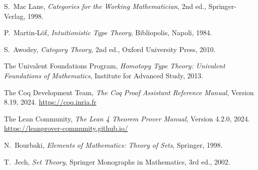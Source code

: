 \documentclass[11pt]{article}
\begin{document}
\begin{thebibliography}{99}
S.~Mac Lane, \emph{Categories for the Working Mathematician}, 2nd ed., Springer-Verlag, 1998.

P.~Martin-Löf, \emph{Intuitionistic Type Theory}, Bibliopolis, Napoli, 1984.

S.~Awodey, \emph{Category Theory}, 2nd ed., Oxford University Press, 2010.

The Univalent Foundations Program, \emph{Homotopy Type Theory: Univalent Foundations of Mathematics}, Institute for Advanced Study, 2013.

The Coq Development Team, \emph{The Coq Proof Assistant Reference Manual}, Version 8.19, 2024. \url{https://coq.inria.fr}

The Lean Community, \emph{The Lean 4 Theorem Prover Manual}, Version 4.2.0, 2024. \url{https://leanprover-community.github.io/}

N.~Bourbaki, \emph{Elements of Mathematics: Theory of Sets}, Springer, 1998.

T.~Jech, \emph{Set Theory}, Springer Monographs in Mathematics, 3rd ed., 2002.

\end{thebibliography}
\end{document}
